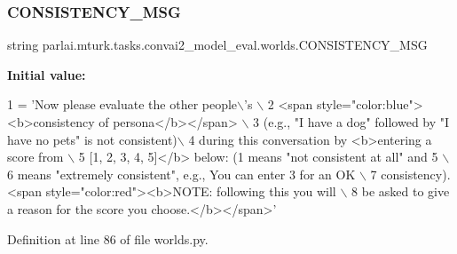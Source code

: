 \mbox{\label{namespaceparlai_1_1mturk_1_1tasks_1_1convai2__model__eval_1_1worlds_ae78f811c94c18030e9d5ecad914dbe11}} 
\subsubsection{\texorpdfstring{C\+O\+N\+S\+I\+S\+T\+E\+N\+C\+Y\+\_\+\+M\+SG}{CONSISTENCY\_MSG}}
{\footnotesize\ttfamily string parlai.\+mturk.\+tasks.\+convai2\+\_\+model\+\_\+eval.\+worlds.\+C\+O\+N\+S\+I\+S\+T\+E\+N\+C\+Y\+\_\+\+M\+SG}

{\bfseries Initial value\+:}
\begin{DoxyCode}
1 =  \textcolor{stringliteral}{'Now please evaluate the other people\(\backslash\)'s \(\backslash\)}
2 \textcolor{stringliteral}{        <span style="color:blue"><b>consistency of persona</b></span> \(\backslash\)}
3 \textcolor{stringliteral}{        (e.g., "I have a dog" followed by "I have no pets" is not consistent)\(\backslash\)}
4 \textcolor{stringliteral}{        during this conversation by <b>entering a score from \(\backslash\)}
5 \textcolor{stringliteral}{        [1, 2, 3, 4, 5]</b> below: (1 means "not consistent at all" and 5 \(\backslash\)}
6 \textcolor{stringliteral}{        means "extremely consistent", e.g., You can enter 3 for an OK \(\backslash\)}
7 \textcolor{stringliteral}{        consistency). <span style="color:red"><b>NOTE: following this you will \(\backslash\)}
8 \textcolor{stringliteral}{        be asked to give a reason for the score you choose.</b></span>'}
\end{DoxyCode}


Definition at line 86 of file worlds.\+py.

\mbox{\label{namespaceparlai_1_1mturk_1_1tasks_1_1convai2__model__eval_1_1worlds_ad11d430fbbe7dfa3708806e074fba042}} 
